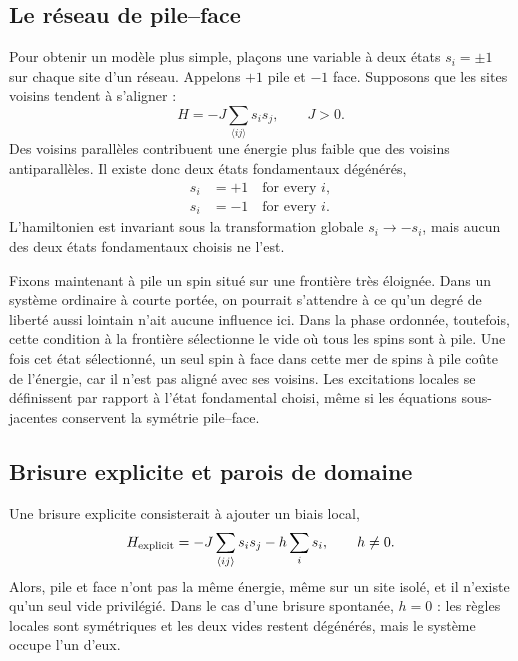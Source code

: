 \subsection{Le réseau de pile--face}

Pour obtenir un modèle plus simple, plaçons une variable à deux états \(s_i=\pm1\) sur chaque site d’un réseau. Appelons \(+1\) pile et \(-1\) face. Supposons que les sites voisins tendent à s’aligner :
\begin{equation}
  H=-J\sum_{\langle ij\rangle}s_i s_j,
  \qquad J>0.
\end{equation}
Des voisins parallèles contribuent une énergie plus faible que des voisins antiparallèles. Il existe donc deux états fondamentaux dégénérés,
\begin{equation}
\begin{aligned}
  s_i&=+1\quad\text{for every }i,
  \\
  s_i&=-1\quad\text{for every }i.
\end{aligned}
\end{equation}
L’hamiltonien est invariant sous la transformation globale \(s_i\to-s_i\), mais aucun des deux états fondamentaux choisis ne l’est.

Fixons maintenant à pile un spin situé sur une frontière très éloignée. Dans un système ordinaire à courte portée, on pourrait s’attendre à ce qu’un degré de liberté aussi lointain n’ait aucune influence ici. Dans la phase ordonnée, toutefois, cette condition à la frontière sélectionne le vide où tous les spins sont à pile. Une fois cet état sélectionné, un seul spin à face dans cette mer de spins à pile coûte de l’énergie, car il n’est pas aligné avec ses voisins. Les excitations locales se définissent par rapport à l’état fondamental choisi, même si les équations sous-jacentes conservent la symétrie pile--face.

\subsection{Brisure explicite et parois de domaine}

Une brisure explicite consisterait à ajouter un biais local,
\begin{equation}
  H_{\rm explicit}
  =-J\sum_{\langle ij\rangle}s_i s_j-h\sum_i s_i,
  \qquad h\ne0.
\end{equation}
Alors, pile et face n’ont pas la même énergie, même sur un site isolé, et il n’existe qu’un seul vide privilégié. Dans le cas d’une brisure spontanée, \(h=0\) : les règles locales sont symétriques et les deux vides restent dégénérés, mais le système occupe l’un d’eux.

